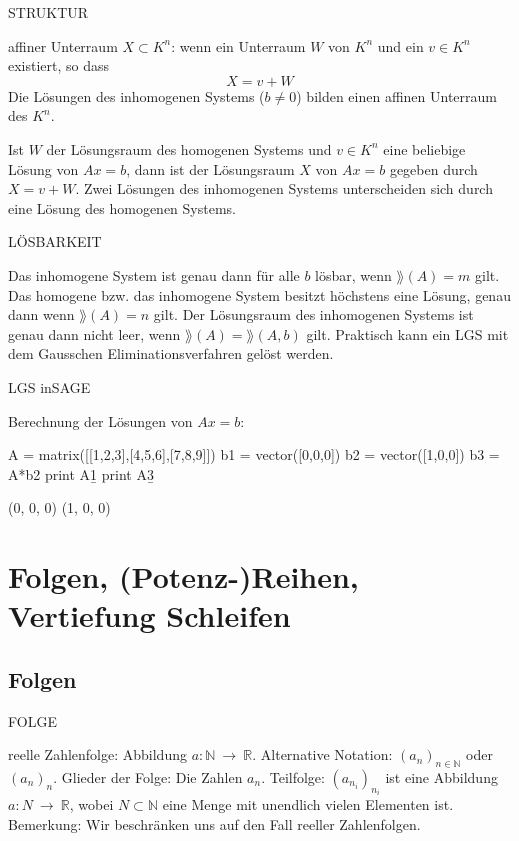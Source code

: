 \documentclass[fontsize=12pt,paper=a4,twoside,bibtotoc,idxtotoc,
liststotoc,pagesize,BCOR1.2cm,DIV15,chapterprefix,pagesize=pdftex]{scrbook}
\theoremstyle{plain}
\theoremstyle{definition}
\theoremstyle{remark}
\begin{document}
STRUKTUR


 {\color{red} affiner Unterraum}  $X \subset K^n$: wenn ein
Unterraum $W$ von $K^n$ und ein $v \in K^n$ existiert, so dass 
\[X=v+W\]
 Die Lösungen des inhomogenen Systems ($b \neq 0$) bilden einen affinen
Unterraum des $K^n$.   

 Ist $W$ der Lösungsraum des homogenen Systems und $v \in K^n$
eine beliebige Lösung von $Ax=b$, dann ist der Lösungsraum $X$ von $Ax=b$
gegeben durch  $X=v+W$.
 Zwei Lösungen des inhomogenen Systems unterscheiden sich durch
eine Lösung des homogenen Systems.


LÖSBARKEIT


 Das inhomogene System ist genau dann für alle $b$
lösbar, wenn $\rang(A)=m$ gilt.
 Das homogene bzw. das inhomogene System besitzt höchstens eine
Lösung, genau dann wenn $\rang(A)=n$ gilt.
 Der Lösungsraum des inhomogenen Systems ist genau dann nicht
leer, wenn $\rang(A)=\rang(A, b)$ gilt. %
 Praktisch kann ein LGS mit dem {\color{red} Gausschen
Eliminationsverfahren} gelöst werden.


LGS inSAGE

Berechnung der Lösungen von $Ax=b$: 
\begin{sagein}
A = matrix([[1,2,3],[4,5,6],[7,8,9]])
b1 = vector([0,0,0])
b2 = vector([1,0,0])
b3 = A*b2
print A\b1
print A\b3
\end{sagein}
\begin{sage}
(0, 0, 0)
(1, 0, 0) 
\end{sage}


\chapter{Folgen, (Potenz-)Reihen, Vertiefung Schleifen}
\section{Folgen}

FOLGE


 {\color{red} reelle Zahlenfolge}: Abbildung $a:\mathbb{N} \ \rightarrow \ \mathbb{R}$.
 Alternative Notation: $(a_n)_{n \in \mathbb{N}}$ oder $(a_n)_{n}$.
 {\color{red} Glieder} der Folge: Die Zahlen $a_n$.
 {\color{red} Teilfolge}: $(a_{n_i})_{n_i}$ ist eine Abbildung $a:N \
\rightarrow \ \mathbb{R}$, wobei $N \subset \mathbb{N}$ eine Menge mit
unendlich vielen Elementen ist.
 Bemerkung: Wir beschränken uns auf den Fall reeller Zahlenfolgen. 
\end{document}
